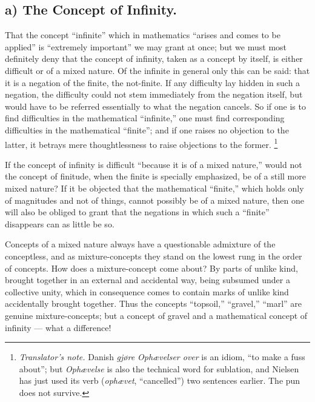 \documentclass[12pt,a4paper]{book}
\renewcommand{\thefootnote}{\ifcase\value{footnote}\or *)\or **)\or ***)\fi}
\newcommand{\tnote}[1]{%
  \begingroup
  \renewcommand{\thefootnote}{\textdagger}%
  \footnote{\emph{Translator's note.} #1}%
  \addtocounter{footnote}{-1}%
  \endgroup}
\begin{document}
\subsection*{a) The Concept of Infinity.}

That the concept ``infinite'' which in mathematics ``arises and comes to be
applied'' is ``extremely important'' we may grant at once; but we must most
definitely deny that the concept of infinity, taken as a concept by itself, is
either difficult or of a mixed nature. Of the infinite in general only this can
be said: that it is a negation of the finite, the not-finite. If any difficulty
lay hidden in such a negation, the difficulty could not stem immediately from
the negation itself, but would have to be referred essentially to what the
negation cancels. So if one is to find difficulties in the mathematical
``infinite,'' one must find corresponding difficulties in the mathematical
``finite''; and if one raises no objection to the latter, it betrays mere
thoughtlessness to raise objections to the former.\tnote{Danish \emph{gjøre
Ophævelser over} is an idiom, ``to make a fuss about''; but \emph{Ophævelse} is
also the technical word for sublation, and Nielsen has just used its verb
(\emph{ophævet}, ``cancelled'') two sentences earlier. The pun does not
survive.} If the concept of infinity is difficult ``because it is of a mixed
nature,'' would not the concept of finitude, when the finite is specially
emphasized, be of a still more mixed nature? If it be objected that the
mathematical ``finite,'' which holds only of magnitudes and not of things,
cannot possibly be of a mixed nature, then one will also be obliged
to grant that the negations in which such a ``finite'' disappears can as little
be so.

Concepts of a mixed nature always have a questionable admixture of the
conceptless, and as mixture-concepts they stand on the lowest rung in the order
of concepts. How does a mixture-concept come about? By parts of unlike kind,
brought together in an external and accidental way, being subsumed under a
collective unity, which in consequence comes to contain marks of unlike kind
accidentally brought together. Thus the concepts ``topsoil,'' ``gravel,''
``marl'' are genuine mixture-concepts; but a concept of gravel and a
mathematical concept of infinity --- what a difference!
\end{document}
